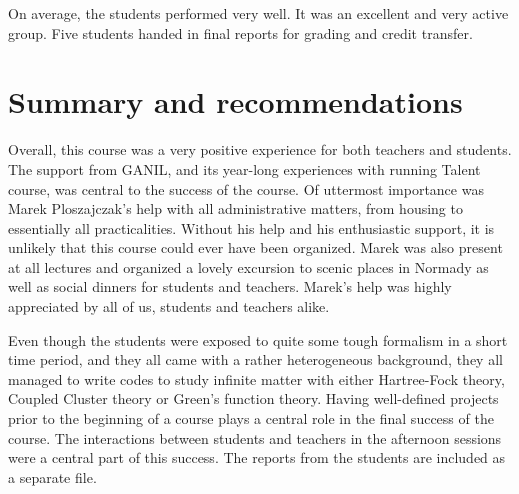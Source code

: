\documentclass[prc,amsart,english]{revtex4}
\begin{document}
On average, the students performed very well. It was an excellent  and very active group. 
Five students handed in final reports for grading and credit transfer. 
\section{Summary and recommendations}

Overall, this course was a very positive experience for both teachers
and students.  The support from GANIL, and its year-long experiences
with running Talent course, was central to the success of the
course. Of uttermost importance was Marek  Ploszajczak's help with
all administrative matters, from housing to essentially all  practicalities.
Without his help and his  enthusiastic support, it is unlikely that this
course could ever have been organized. Marek was also present at all lectures and organized a
lovely excursion to scenic places in Normady as well as social dinners for students and teachers. 
Marek's help was highly appreciated by all of us, students and teachers alike. 

Even though the students were exposed to quite some tough formalism in a short time period, and they all came with a rather heterogeneous background, they all managed to write codes to study infinite matter with either Hartree-Fock theory, Coupled Cluster theory or Green's function theory. Having well-defined projects prior to the beginning of a course plays a central role in the final success of the course. The interactions between students and teachers in the afternoon sessions
were a central part of this success. 
The reports
from the students are included as a separate file. 
\end{document}
